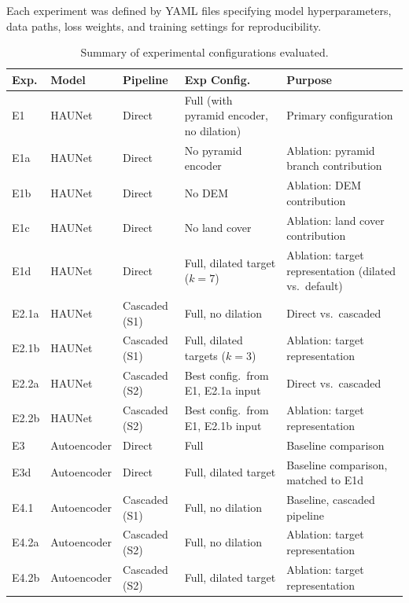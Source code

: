 \documentclass[a4paper, 11pt]{article} %
\begin{document}
Each experiment was defined by YAML files specifying model hyperparameters, data paths, loss weights, and training settings for reproducibility.

\begin{table}[htbp]
\centering
\small
\caption{Summary of experimental configurations evaluated.}
\label{tab:experiments}
\begin{tabularx}{\textwidth}{llllY}
\hline
\textbf{Exp.} & \textbf{Model} & \textbf{Pipeline} & \textbf{Exp Config.} & \textbf{Purpose} \\ \hline
E1  & HAUNet      & Direct         & Full (with pyramid encoder, no dilation)      & Primary configuration \\
E1a & HAUNet      & Direct         & No pyramid encoder               & Ablation: pyramid branch contribution \\
E1b & HAUNet      & Direct         & No DEM                           & Ablation: DEM contribution \\
E1c & HAUNet      & Direct         & No land cover                    & Ablation: land cover contribution \\
E1d & HAUNet      & Direct         & Full, dilated target ($k{=}7$) & Ablation: target representation (dilated vs.\ default) \\
E2.1a  & HAUNet      & Cascaded (S1)  & Full, no dilation      & Direct vs.\ cascaded \\
E2.1b  & HAUNet      & Cascaded (S1)  & Full, dilated targets ($k{=}3$)      & Ablation: target representation \\
E2.2a  & HAUNet      & Cascaded (S2)  & Best config.\ from E1, E2.1a input & Direct vs.\ cascaded \\
E2.2b  & HAUNet      & Cascaded (S2)  & Best config.\ from E1, E2.1b input & Ablation: target representation \\
E3  & Autoencoder & Direct         & Full                             & Baseline comparison \\
E3d & Autoencoder & Direct         & Full, dilated target                       & Baseline comparison, matched to E1d \\
E4.1  & Autoencoder & Cascaded (S1)   & Full, no dilation    & Baseline, cascaded pipeline \\ 
E4.2a  & Autoencoder & Cascaded (S2)  & Full, no dilation  &  Ablation: target representation \\
E4.2b  & Autoencoder & Cascaded (S2)  & Full, dilated target  &  Ablation: target representation \\ \hline
\end{tabularx}
\end{table}
\end{document}
